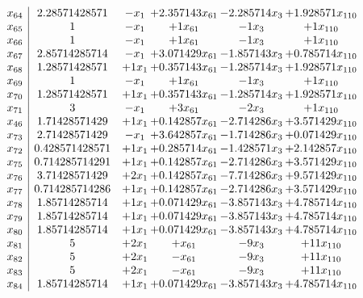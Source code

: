 \documentclass[11pt]{article}
\begin{document}
\[\begin{array}{c| c c@{\hskip 2pt} c@{\hskip 2pt} c@{\hskip 2pt} c@{\hskip 2pt} }
 x_{64}   &  2.28571428571 & - x_{1} & + 2.357143 x_{61} & -2.285714 x_{3} & + 1.928571 x_{110}\\
 x_{65}   &  1 & - x_{1} & + 1 x_{61} & -1 x_{3} & + 1 x_{110}\\
 x_{66}   &  1 & - x_{1} & + 1 x_{61} & -1 x_{3} & + 1 x_{110}\\
 x_{67}   &  2.85714285714 & - x_{1} & + 3.071429 x_{61} & -1.857143 x_{3} & + 0.785714 x_{110}\\
 x_{68}   &  1.28571428571 & + 1 x_{1} & + 0.357143 x_{61} & -1.285714 x_{3} & + 1.928571 x_{110}\\
 x_{69}   &  1 & - x_{1} & + 1 x_{61} & -1 x_{3} & + 1 x_{110}\\
 x_{70}   &  1.28571428571 & + 1 x_{1} & + 0.357143 x_{61} & -1.285714 x_{3} & + 1.928571 x_{110}\\
 x_{71}   &  3 & - x_{1} & + 3 x_{61} & -2 x_{3} & + 1 x_{110}\\
 x_{46}   &  1.71428571429 & + 1 x_{1} & + 0.142857 x_{61} & -2.714286 x_{3} & + 3.571429 x_{110}\\
 x_{73}   &  2.71428571429 & - x_{1} & + 3.642857 x_{61} & -1.714286 x_{3} & + 0.071429 x_{110}\\
 x_{72}   &  0.428571428571 & + 1 x_{1} & + 0.285714 x_{61} & -1.428571 x_{3} & + 2.142857 x_{110}\\
 x_{75}   &  0.714285714291 & + 1 x_{1} & + 0.142857 x_{61} & -2.714286 x_{3} & + 3.571429 x_{110}\\
 x_{76}   &  3.71428571429 & + 2 x_{1} & + 0.142857 x_{61} & -7.714286 x_{3} & + 9.571429 x_{110}\\
 x_{77}   &  0.714285714286 & + 1 x_{1} & + 0.142857 x_{61} & -2.714286 x_{3} & + 3.571429 x_{110}\\
 x_{78}   &  1.85714285714 & + 1 x_{1} & + 0.071429 x_{61} & -3.857143 x_{3} & + 4.785714 x_{110}\\
 x_{79}   &  1.85714285714 & + 1 x_{1} & + 0.071429 x_{61} & -3.857143 x_{3} & + 4.785714 x_{110}\\
 x_{80}   &  1.85714285714 & + 1 x_{1} & + 0.071429 x_{61} & -3.857143 x_{3} & + 4.785714 x_{110}\\
 x_{81}   &  5 & + 2 x_{1} & +  x_{61} & -9 x_{3} & + 11 x_{110}\\
 x_{82}   &  5 & + 2 x_{1} & - x_{61} & -9 x_{3} & + 11 x_{110}\\
 x_{83}   &  5 & + 2 x_{1} & - x_{61} & -9 x_{3} & + 11 x_{110}\\
 x_{84}   &  1.85714285714 & + 1 x_{1} & + 0.071429 x_{61} & -3.857143 x_{3} & + 4.785714 x_{110}\\

\end{array}\]
\end{document}
